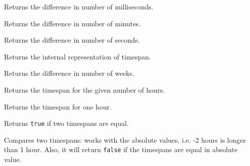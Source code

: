 
Returns the difference in number of milliseconds.

\label{wxtimespangetminutes}


Returns the difference in number of minutes.

\label{wxtimespangetseconds}


Returns the difference in number of seconds.

\label{wxtimespangetvalue}


Returns the internal representation of timespan.

\label{wxtimespangetweeks}


Returns the difference in number of weeks.

\label{wxtimespanhours}


Returns the timespan for the given number of hours.

\label{wxtimespanhour}


Returns the timespan for one hour.

\label{wxtimespanisequalto}


Returns {\tt true} if two timespans are equal.

\label{wxtimespanislongerthan}


Compares two timespans: works with the absolute values, i.e. -2
hours is longer than 1 hour. Also, it will return {\tt false} if
the timespans are equal in absolute value.

\label{wxtimespanisnegative}

